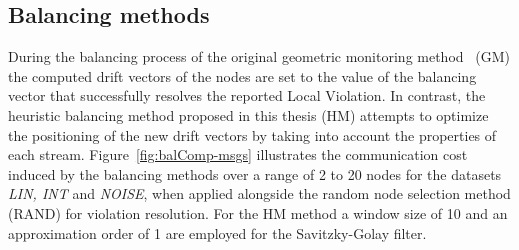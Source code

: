 \subsection{Balancing methods} \label{subsec:balComp}

During the balancing process of the original geometric monitoring method~\cite{Sharfman2006GM} (GM) the computed drift vectors of the nodes are set to the value of the balancing vector that successfully resolves the reported Local Violation. In contrast, the heuristic balancing method proposed in this thesis (HM) attempts to optimize the positioning of the new drift vectors by taking into account the properties of each stream. Figure~\ref{fig:balComp-msgs} illustrates the communication cost induced by the balancing methods over a range of 2 to 20 nodes for the datasets \emph{LIN, INT} and \emph{NOISE}, when applied alongside the random node selection method (RAND) for violation resolution. For the HM method a window size of 10 and an approximation order of 1 are employed for the Savitzky-Golay filter.

